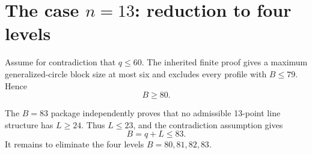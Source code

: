 \section{The case $n=13$: reduction to four levels}

Assume for contradiction that $q\le60$.  The inherited finite proof gives a maximum generalized-circle block size at most six and excludes every profile with $B\le79$.  Hence
\begin{equation}\label{eq:Bge80}
 B\ge80.
\end{equation}

The $B=83$ package independently proves that no admissible 13-point line structure has $L\ge24$.  Thus $L\le23$, and the contradiction assumption gives
\begin{equation}\label{eq:B83bound}
 B=q+L\le83.
\end{equation}
It remains to eliminate the four levels $B=80,81,82,83$.

